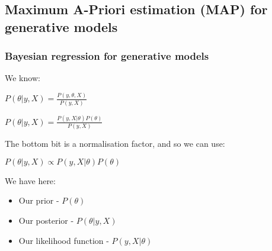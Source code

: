 
\subsection{Maximum A-Priori estimation (MAP) for generative models}

\subsubsection{Bayesian regression for generative models}

We know:

\(P(\theta |y,X)=\frac{P(y, \theta, X )}{P(y, X)}\)

\(P(\theta |y,X)=\frac{P(y, X |\theta )P(\theta )}{P(y, X)}\)

The bottom bit is a normalisation factor, and so we can use:

\(P(\theta |y,X)\propto P(y, X| \theta)P(\theta)\)

We have here:

\begin{itemize}
\item Our prior - \(P(\theta )\)
\item Our posterior - \(P(\theta |y,X)\)
\item Our likelihood function - \(P(y, X| \theta )\)
\end{itemize}


